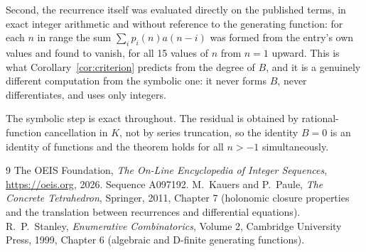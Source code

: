 \documentclass[11pt,a4paper]{article}
\theoremstyle{plain}
\theoremstyle{definition}
\begin{document}
Second, the recurrence itself was evaluated directly on the published terms, in exact
integer arithmetic and without reference to the generating function: for each $n$ in range
the sum $\sum_{i}p_{i}(n)a(n-i)$ was formed from the entry's own values and found to
vanish, for all 15 values of $n$ from $n=1$ upward. This is what
Corollary~\ref{cor:criterion} predicts from the degree of $B$, and it is a genuinely
different computation from the symbolic one: it never forms $B$, never differentiates, and
uses only integers.

The symbolic step is exact throughout. The residual is obtained by rational-function
cancellation in $K$, not by series truncation, so the identity $B=0$ is an
identity of functions and the theorem holds for all $n>-1$ simultaneously.

\begin{thebibliography}{9}
 The OEIS Foundation, \emph{The On-Line Encyclopedia of Integer Sequences},
\url{https://oeis.org}, 2026. Sequence A097192.
 M.~Kauers and P.~Paule, \emph{The Concrete Tetrahedron}, Springer, 2011,
Chapter 7 (holonomic closure properties and the translation between recurrences and
differential equations).
 R.~P.~Stanley, \emph{Enumerative Combinatorics}, Volume 2, Cambridge
University Press, 1999, Chapter 6 (algebraic and D-finite generating functions).
\end{thebibliography}
\end{document}
